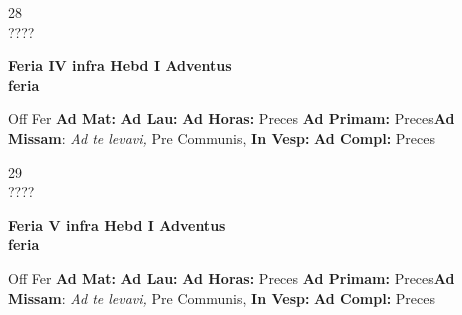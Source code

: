 \documentclass[10pt, openany]{book}
\begin{document}
    \begin{center}
        \begin{minipage}{3.5in}
            \vspace{2em}
            \begin{minipage}{0.5in}
                {\Huge 28} \\
                {\normalsize ????}
            \end{minipage}
            \begin{minipage}{3.0in}
                \textbf{ \large Feria IV infra Hebd I Adventus \\
                \textnormal{\normalsize feria}}

            \end{minipage}
            \begin{justify}Off Fer
                \textbf{Ad Mat: }
                \textbf{Ad Lau: }
                \textbf{Ad Horas: }Preces
                \textbf{Ad Primam: }Preces\textbf{Ad Missam}: \textit{Ad te levavi,} Pre Communis, 
                \textbf{In Vesp: }
                \textbf{Ad Compl: }Preces
            \end{justify}
        \end{minipage}
    \end{center}

    \begin{center}
        \begin{minipage}{3.5in}
            \vspace{2em}
            \begin{minipage}{0.5in}
                {\Huge 29} \\
                {\normalsize ????}
            \end{minipage}
            \begin{minipage}{3.0in}
                \textbf{ \large Feria V infra Hebd I Adventus \\
                \textnormal{\normalsize feria}}

            \end{minipage}
            \begin{justify}Off Fer
                \textbf{Ad Mat: }
                \textbf{Ad Lau: }
                \textbf{Ad Horas: }Preces
                \textbf{Ad Primam: }Preces\textbf{Ad Missam}: \textit{Ad te levavi,} Pre Communis, 
                \textbf{In Vesp: }
                \textbf{Ad Compl: }Preces
            \end{justify}
        \end{minipage}
    \end{center}
\end{document}
